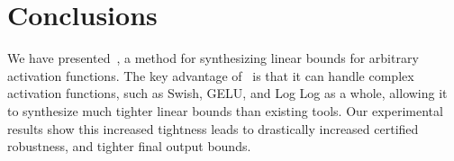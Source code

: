 %



\section{Conclusions}
\label{onlinesyn:sec:conclusion}

We have presented~\Name{}, a method for synthesizing linear bounds for
arbitrary activation functions.
%
%
The key advantage of~\Name{} is that it can handle complex
activation functions, such as Swish, GELU, and Log Log as a whole, allowing it
to synthesize much tighter linear bounds than existing tools.
%
Our experimental
results show this increased tightness leads to drastically increased certified
robustness, and tighter final output bounds.



